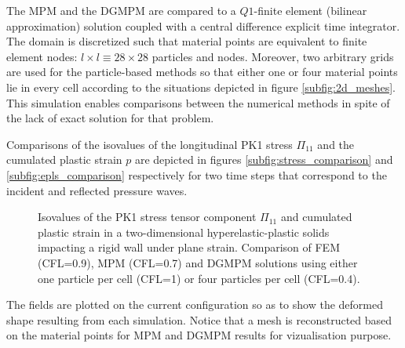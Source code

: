 The MPM and the DGMPM are compared to a $Q1$-finite element (bilinear approximation) solution coupled with a central difference explicit time integrator.
The domain is discretized such that material points are equivalent to finite element nodes: $l\times l \equiv 28 \times 28$ particles and nodes.
Moreover, two arbitrary grids are used for the particle-based methods so that either one or four material points lie in every cell according to the situations depicted in figure \ref{subfig:2d_meshes}.
This simulation enables comparisons between the numerical methods in spite of the lack of exact solution for that problem.


Comparisons of the isovalues of the longitudinal PK1 stress $\Pi_{11}$ and the cumulated plastic strain $p$ are depicted in figures \ref{subfig:stress_comparison} and \ref{subfig:epls_comparison} respectively for two time steps that correspond to the incident and reflected pressure waves.
\begin{figure}[ht]
  \centering
  \qquad
  \caption{Isovalues of the PK1 stress tensor component $\Pi_{11}$ and cumulated plastic strain in a two-dimensional hyperelastic-plastic solids impacting a rigid wall under plane strain. Comparison of FEM (CFL=0.9), MPM (CFL=0.7) and DGMPM solutions using either one particle per cell (CFL=1) or four particles per cell (CFL=0.4).}
  \label{fig:PS_taylor}
\end{figure}
The fields are plotted on the current configuration so as to show the deformed shape resulting from each simulation.
Notice that a mesh is reconstructed based on the material points for MPM and DGMPM results for vizualisation purpose.

